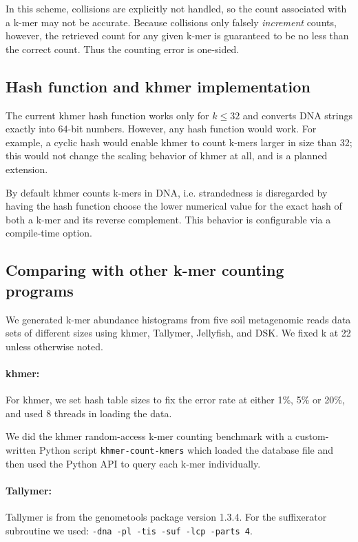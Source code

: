 \documentclass[10pt]{article}
\begin{document}
In this scheme, collisions are explicitly not handled, so the count
associated with a k-mer may not be accurate. Because collisions only
falsely {\em increment} counts, however, the retrieved count for any
given k-mer is guaranteed to be no less than the correct count.  Thus
the counting error is one-sided.

\subsection*{Hash function and khmer implementation}

The current khmer hash function works only for $k \le 32$ and converts
DNA strings exactly into 64-bit numbers.  However, any hash function
would work. For example, a cyclic hash would enable khmer to count
k-mers larger in size than 32; this would not change the scaling
behavior of khmer at all, and is a planned extension.

By default khmer counts k-mers in DNA, i.e. strandedness is
disregarded by having the hash function choose the lower numerical
value for the exact hash of both a k-mer and its reverse complement.
This behavior is configurable via a compile-time option.

\subsection*{Comparing with other k-mer counting programs}

We generated k-mer abundance histograms from five soil metagenomic reads
data sets of different sizes using khmer, Tallymer, Jellyfish, and DSK.
We fixed k at 22 unless otherwise noted.

\paragraph{khmer:}
For khmer, we set hash table sizes to fix the error rate at
either 1\%, 5\% or 20\%, and used 8 threads in loading the data.

We did the khmer random-access k-mer counting benchmark with a
custom-written Python script {\tt khmer-count-kmers} which loaded the
database file and then used the Python API to query each k-mer
individually.

\paragraph{Tallymer:}
Tallymer is from the genometools package version 1.3.4. For the suffixerator subroutine 
we used:
{\tt -dna -pl -tis -suf -lcp -parts 4}.
\end{document}
